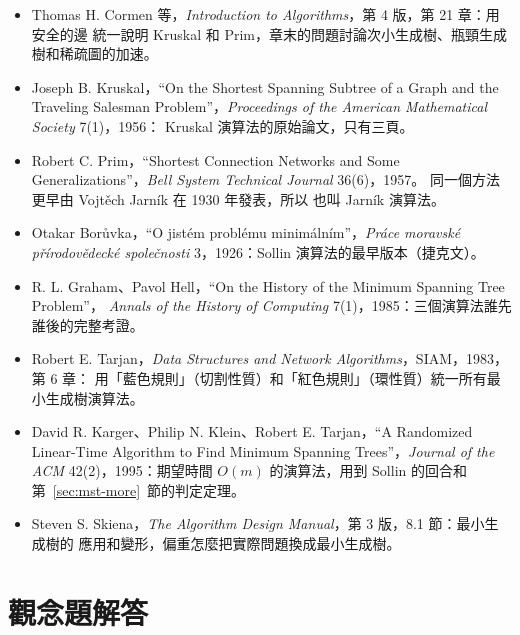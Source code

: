 \begin{itemize}
\item Thomas H. Cormen 等，\textit{Introduction to Algorithms}，第 4 版，第 21 章：用安全的邊
統一說明 Kruskal 和 Prim，章末的問題討論次小生成樹、瓶頸生成樹和稀疏圖的加速。
\item Joseph B. Kruskal，``On the Shortest Spanning Subtree of a Graph and the Traveling
Salesman Problem''，\textit{Proceedings of the American Mathematical Society} 7(1)，1956：
Kruskal 演算法的原始論文，只有三頁。
\item Robert C. Prim，``Shortest Connection Networks and Some Generalizations''，\textit{Bell
System Technical Journal} 36(6)，1957。 同一個方法更早由 Vojtěch Jarník 在 1930 年發表，所以
也叫 Jarník 演算法。
\item Otakar Borůvka，``O jistém problému minimálním''，\textit{Práce moravské
přírodovědecké společnosti} 3，1926：Sollin 演算法的最早版本（捷克文）。
\item R. L. Graham、Pavol Hell，``On the History of the Minimum Spanning Tree Problem''，
\textit{Annals of the History of Computing} 7(1)，1985：三個演算法誰先誰後的完整考證。
\item Robert E. Tarjan，\textit{Data Structures and Network Algorithms}，SIAM，1983，第 6 章：
用「藍色規則」（切割性質）和「紅色規則」（環性質）統一所有最小生成樹演算法。
\item David R. Karger、Philip N. Klein、Robert E. Tarjan，``A Randomized Linear-Time
Algorithm to Find Minimum Spanning Trees''，\textit{Journal of the ACM} 42(2)，1995：期望時間
$O(m)$ 的演算法，用到 Sollin 的回合和第~\ref{sec:mst-more}~節的判定定理。
\item Steven S. Skiena，\textit{The Algorithm Design Manual}，第 3 版，8.1 節：最小生成樹的
應用和變形，偏重怎麼把實際問題換成最小生成樹。
\end{itemize}

\section*{觀念題解答}

